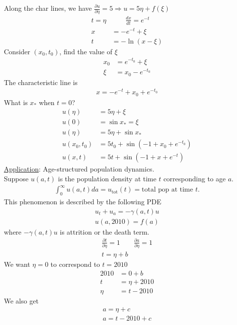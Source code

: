 \documentclass[12pt, letterpaper]{article}
\begin{document}
Along the char lines, we have $\frac{\partial u}{\partial \eta} = 5 \Rightarrow u = 5\eta + f(\xi)$
\begin{align*}
    t = \eta &\qquad \frac{dx}{dt} = e^{-t} \\
    x &= -e^{-t} + \xi  \\
    t &= -\ln(x-\xi) 
\end{align*}
Consider $(x_0,t_0)$, find the value of $\xi$
\begin{align*}
    x_0 &= e^{-t_0} + \xi \\
    \xi &= x_0 - e^{-t_0}
\end{align*}
The characteristic line is 
\begin{align*}
    x = -e^{-t}+x_0 + e^{-t_0}
\end{align*}
What is $x_\ast$ when $t = 0$?
\begin{align*}
    u(\eta) &= 5\eta + \xi \\
    u(0) &= \sin x_\ast = \xi \\
    u(\eta) &= 5\eta + \sin x_\ast \\
    u(x_0, t_0) &= 5t_0 + \sin(-1+x_0 + e^{-t_0}) \\
    u(x,t) &= 5t + \sin(-1+x+e^{-t})
\end{align*}
\underline{Application}: Age-structured population dynamics.  \\
Suppose $u(a,t)$ is the population density at time $t$ corresponding to age $a$.
\begin{align*}
    \int_{0}^{\infty} u(a,t) da = u_{\text{tot}}(t) = \text{total pop at time }t.
\end{align*} 
This phenomenon is described by the following PDE
\begin{align*}
    u_t + u_a = -\gamma(a,t)u \\
    u(a,2010) = f(a)
\end{align*}
where $-\gamma(a,t)u$ is attrition or the death term.
\begin{align*}
    \frac{\partial t}{\partial \eta} = 1 \qquad \frac{\partial a}{\partial \eta} = 1 \\
    t = \eta + b 
\end{align*}
We want $\eta = 0$ to correspond to $t = 2010$ \\
\begin{align*}
    2010 &= 0 + b \\
    t &= \eta + 2010 \\
    \eta &= t - 2010
\end{align*}
We also get 
\begin{align*}
    a = \eta + c \\
    a = t - 2010 + c
\end{align*}
\end{document}
